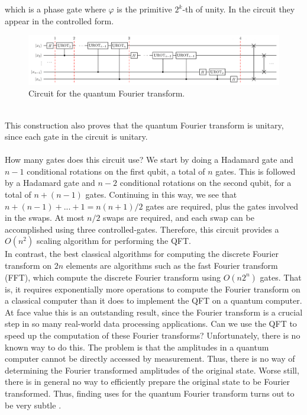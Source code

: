 which is a phase gate where $\varphi$ is the primitive $2^k$-th of unity. In the circuit they appear in the controlled form.
\begin{figure}[ht]
  \centering
  \includegraphics[width=\textwidth]{figures/QFT circuit 1.png}
  \caption{Circuit for the quantum Fourier transform.} \label{QFT circuit}
\end{figure} \\
This construction also proves that the quantum Fourier transform is unitary, since each gate in the circuit is unitary. \\
\\
How many gates does this circuit use? We start by doing a Hadamard gate and $n-1$ conditional rotations on the first qubit, a total of $n$ gates. This is followed by a Hadamard gate and $n-2$ conditional rotations on the second qubit, for a total of $n + (n-1)$ gates. Continuing in this way, we see that $n+(n-1)+...+1 = n(n+1)/2$ gates are required, plus the gates involved in the swaps. At most $n/2$ swaps are required, and each swap can be accomplished using three controlled-gates. Therefore, this circuit provides a $O(n^2)$ scaling algorithm for performing the QFT. \\
In contrast, the best classical algorithms for computing the discrete Fourier transform on $2n$ elements are algorithms such as the fast Fourier transform (FFT), which compute the discrete Fourier transform using $O(n2^n)$ gates. That is, it requires exponentially more operations to compute the Fourier transform on a classical computer than it does to implement the QFT on a quantum computer. \\
At face value this is an outstanding result, since the Fourier transform is a crucial step in so many real-world data processing applications. Can we use the QFT to speed up the computation of these Fourier transforms? Unfortunately, there is no known way to do this. The problem is that the amplitudes in a quantum computer cannot be directly accessed by measurement. Thus, there is no way of determining the Fourier transformed amplitudes of the original state. Worse still, there is in general no way to efficiently prepare the original state to be Fourier transformed. Thus, finding uses for the quantum Fourier transform turns out to be very subtle \cite{Nielsen2010Dec}.

